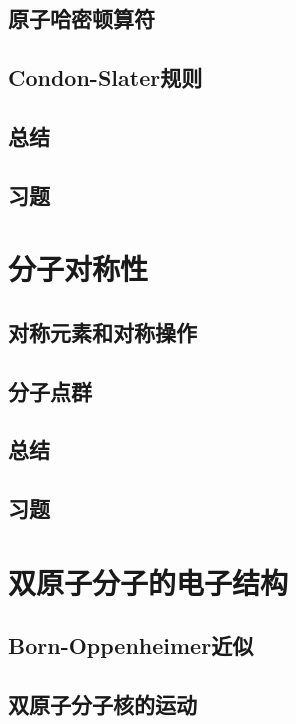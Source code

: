 \documentclass{book}
\begin{document}
	\section{原子哈密顿算符}
	
	\section{Condon-Slater规则}
	
	\section*{总结}
	
	\section*{习题}
	
	\chapter{分子对称性}
	\section{对称元素和对称操作}
	
	\section{分子点群}
	
	\section*{总结}
	
	\section*{习题}
	
	\chapter{双原子分子的电子结构}
	\section{Born-Oppenheimer近似}
	
	\section{双原子分子核的运动}
	
\end{document}
